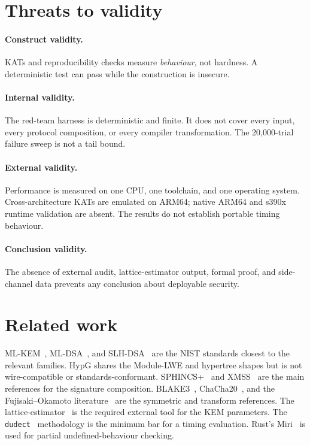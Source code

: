 \documentclass[11pt,a4paper]{article}
\theoremstyle{plain}
\theoremstyle{definition}
\theoremstyle{remark}
\begin{document}
\section{Threats to validity}
\label{sec:validity}

\paragraph{Construct validity.}  KATs and reproducibility checks measure
\emph{behaviour}, not hardness.  A deterministic test can pass while the
construction is insecure.

\paragraph{Internal validity.}  The red-team harness is deterministic and
finite.  It does not cover every input, every protocol composition, or
every compiler transformation.  The 20,000-trial failure sweep is not a
tail bound.

\paragraph{External validity.}  Performance is measured on one CPU,
one toolchain, and one operating system.  Cross-architecture KATs are
emulated on ARM64; native ARM64 and s390x runtime validation are absent.
The results do not establish portable timing behaviour.

\paragraph{Conclusion validity.}  The absence of external audit,
lattice-estimator output, formal proof, and side-channel data prevents
any conclusion about deployable security.

\section{Related work}
\label{sec:related}

ML-KEM~\cite{fips203}, ML-DSA~\cite{fips204}, and
SLH-DSA~\cite{fips205} are the NIST standards closest to the relevant
families.  HypG shares the Module-LWE and hypertree shapes but is not
wire-compatible or standards-conformant.  SPHINCS+~\cite{sphincs} and
XMSS~\cite{rfc8391} are the main references for the signature
composition.  BLAKE3~\cite{blake3}, ChaCha20~\cite{rfc8439}, and the
Fujisaki--Okamoto literature~\cite{fo99,hhk17} are the symmetric and
transform references.  The lattice-estimator~\cite{estimator} is the
required external tool for the KEM parameters.  The
\texttt{dudect}~\cite{dudect} methodology is the minimum bar for a
timing evaluation.  Rust's Miri~\cite{miri} is used for partial
undefined-behaviour checking.
\end{document}
